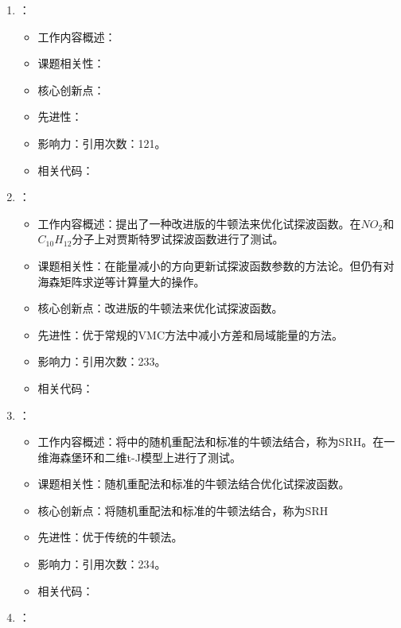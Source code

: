 \begin{enumerate}
\begin{itemize}
            \end{itemize}
        \item \citet{casula2005diffusion}：
            \begin{itemize}
                \item 工作内容概述：
                \item 课题相关性：
                \item 核心创新点：
                \item 先进性：
                \item 影响力：引用次数：121。
                \item 相关代码：
            \end{itemize}
        \item \citet{umrigar2005energy}：
            \begin{itemize}
                \item 工作内容概述：提出了一种改进版的牛顿法来优化试探波函数。在$NO_2$和$C_{10}H_{12}$分子上对贾斯特罗试探波函数进行了测试。
                \item 课题相关性：在能量减小的方向更新试探波函数参数的方法论。但仍有对海森矩阵求逆等计算量大的操作。
                \item 核心创新点：改进版的牛顿法来优化试探波函数。
                \item 先进性：优于常规的VMC方法中减小方差和局域能量的方法。
                \item 影响力：引用次数：233。
                \item 相关代码：
            \end{itemize}
            \item \citet{sorella2005wave}：
            \begin{itemize}
                \item 工作内容概述：将\citet{casula2004correlated}中的随机重配法和标准的牛顿法结合，称为SRH。在一维海森堡环和二维t-J模型上进行了测试。
                \item 课题相关性：随机重配法和标准的牛顿法结合优化试探波函数。
                \item 核心创新点：将随机重配法和标准的牛顿法结合，称为SRH
                \item 先进性：优于传统的牛顿法。
                \item 影响力：引用次数：234。
                \item 相关代码：
            \end{itemize}
            \item \citet{schmidt2005green}：

\end{enumerate}
